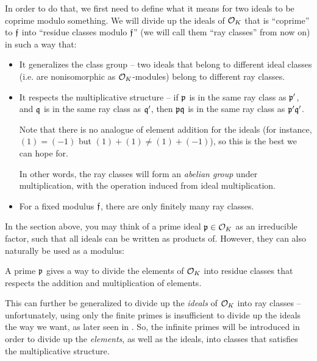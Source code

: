 In order to do that, we first need to define what it means for two ideals to be
coprime modulo something. We will divide up the ideals of $\mathcal O_K$ that is
``coprime'' to $\mathfrak f$ into ``residue classes modulo $\mathfrak f$'' (we will call them
``ray classes'' from now on) in such a way that:
\begin{itemize}
	\item It generalizes the class group -- two ideals that belong to different
		ideal classes (i.e. are nonisomorphic as $\mathcal O_K$-modules) belong to
		different ray classes.
	\item It respects the multiplicative structure -- if $\mathfrak p$ is in the same
		ray class as $\mathfrak p'$, and $\mathfrak q$ is in the same ray class as $\mathfrak q'$, then
		$\mathfrak p \mathfrak q$ is in the same ray class as $\mathfrak p' \mathfrak q'$.

		Note that there is no analogue of element addition for the ideals (for
		instance, $(1) = (-1)$ but $(1) + (1) \ne (1) + (-1)$), so this is the
		best we can hope for.

		In other words, the ray classes will form an \emph{abelian group} under
		multiplication, with the operation induced from ideal multiplication.
	\item For a fixed modulus $\mathfrak f$, there are only finitely many ray
		classes.
\end{itemize}

In the section above, you may think of a prime ideal $\mathfrak p \in \mathcal O_K$ as an
irreducible factor, such that all ideals can be written as products of.
However, they can also naturally be used as a modulus:
\begin{moral}
	A prime $\mathfrak p$ gives a way to divide the elements of $\mathcal O_K$ into residue
	classes that respects the addition and multiplication of elements.
\end{moral}
This can further be generalized to divide
up the \emph{ideals} of $\mathcal O_K$ into ray classes --
unfortunately, using only the finite primes is insufficient to divide up the
ideals the way we want, as later seen in
.
So, the infinite primes will be introduced in order to divide up the
\emph{elements}, as well as the ideals, into classes that satisfies the
multiplicative structure.

